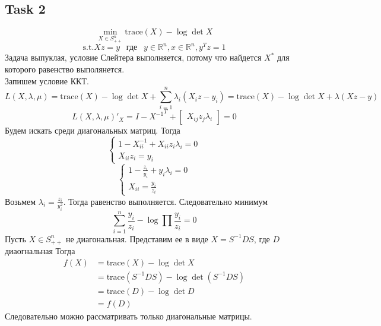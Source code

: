 \documentclass[12pt]{exam}
\begin{document}
\subsection*{Task 2}
$$ \min_{X \in S_{++}^n} \mathrm{trace}(X) - \log \det X$$
$$ \mathrm{s.t. } Xz = y \:\:\textit{ где }\:\: y \in \mathbb{R}^n, x\in \mathbb{R}^n, y^Tz= 1 $$
Задача выпуклая, условие Слейтера выполняется, потому что найдется $X^*$ для которого равенство выполянется.\\
Запишем условие ККТ.\\
$$L(X, \lambda, \mu) = \mathrm{trace}(X) - \log \det X + \sum_{i=1}^n \lambda_i (X_i z - y_i) = \mathrm{trace}(X) - \log \det X + \lambda (Xz - y)$$
$$L(X, \lambda, \mu)'_X = I - {X^{-1}}^T + \begin{bmatrix} X_{ij}z_j \lambda_i \end{bmatrix} = 0$$
Будем искать среди диагональных матриц. Тогда 
\begin{equation}
    \begin{cases}
    1 - X_{ii}^{-1} + X_{ii}z_i\lambda_i = 0\\
    X_{ii}z_i = y_i 
    \end{cases}
\end{equation}
\begin{equation}
    \begin{cases}
    1 - \frac{z_i}{y_i} + y_i\lambda_i = 0\\
    X_{ii} = \frac{y_i}{z_i} 
    \end{cases}
\end{equation}
Возьмем $\lambda_i = \frac{z_i}{y_i^2}$. 
Тогда равенство выполняется. Следовательно минимум
$$ \sum_{i=1}^n \frac{y_i}{z_i} - \log \prod \frac{y_i}{z_i} = 0$$
Пусть $X \in S_{++}^n$ не диагональная. 
Представим ее в виде $X = S^{-1}DS$, где $D$ диаогнальная 
Тогда 
\begin{align*}
    f(X) 
        &= \mathrm{trace}(X) - \log \det X \\ 
        &= \mathrm{trace}(S^{-1}DS) - \log \det (S^{-1}DS) \\ 
        &= \mathrm{trace}(D) - \log \det D \\
        &= f(D)        
\end{align*}
Следовательно можно рассматривать только диагональные матрицы.
\end{document}
